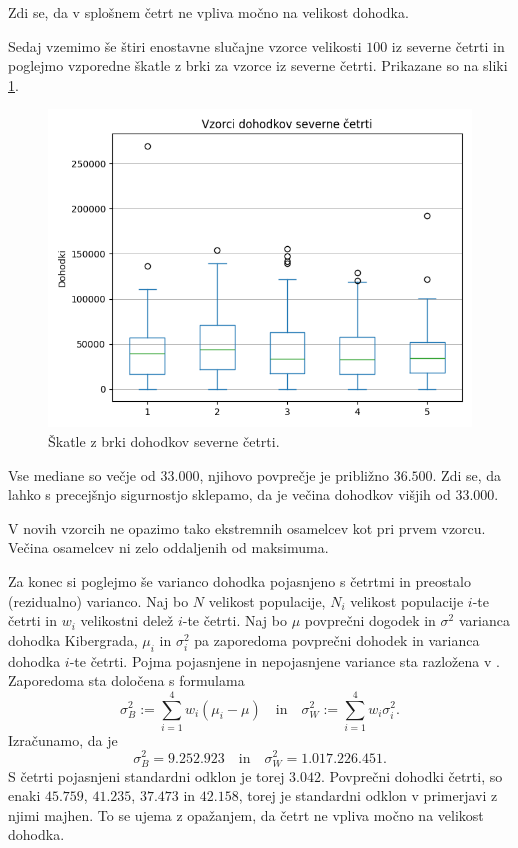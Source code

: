 \documentclass[12pt, a4paper]{article}
\begin{document}
Zdi se, da v splošnem četrt ne vpliva močno na velikost dohodka.

Sedaj vzemimo še štiri enostavne slučajne vzorce velikosti $100$ 
iz severne četrti in poglejmo vzporedne škatle z brki za vzorce
iz severne četrti. Prikazane so na sliki \ref{img:sever}.
\begin{figure}[H]
    \centering
    \includegraphics[width=12cm]{Slike/sever.png}
    \caption{Škatle z brki dohodkov severne četrti.}
    \label{img:sever}
\end{figure}
Vse mediane so večje od $33.000$, njihovo povprečje je približno 
$36.500$. Zdi se, da lahko s precejšnjo sigurnostjo sklepamo, da je večina 
dohodkov višjih od $33.000$.

V novih vzorcih ne opazimo tako ekstremnih osamelcev kot pri prvem vzorcu. Večina 
osamelcev ni zelo oddaljenih od maksimuma.

Za konec si poglejmo še varianco dohodka pojasnjeno s četrtmi in preostalo
(rezidualno) varianco. Naj bo $N$ velikost populacije, $N_i$ velikost 
populacije $i$-te četrti in $w_i$ velikostni delež $i$-te četrti. Naj bo
$\mu$ povprečni dogodek in $\sigma^2$ varianca dohodka Kibergrada,
$\mu_i$ in $\sigma_i^2$ pa zaporedoma povprečni dohodek in varianca 
dohodka $i$-te četrti. 
Pojma pojasnjene in nepojasnjene variance sta razložena v 
\cite{raic}. Zaporedoma sta določena s formulama
\[
    \sigma^2_B := \sum_{i=1}^{4} w_i(\mu_i - \mu)
    \quad \text{in} \quad
    \sigma^2_W := \sum_{i=1}^{4} w_i\sigma_i^2.
\]
Izračunamo, da je 
\[
    \sigma^2_B = 9.252.923
    \quad \text{in} \quad
    \sigma^2_W = 1.017.226.451.
\]
S četrti pojasnjeni 
standardni odklon je torej $3.042$. Povprečni dohodki četrti, 
so enaki $45.759$, $41.235$, $37.473$ in $42.158$, torej je 
standardni odklon v primerjavi z njimi majhen. To se ujema z 
opažanjem, da četrt ne vpliva močno na velikost dohodka.
\newpage
\end{document}
